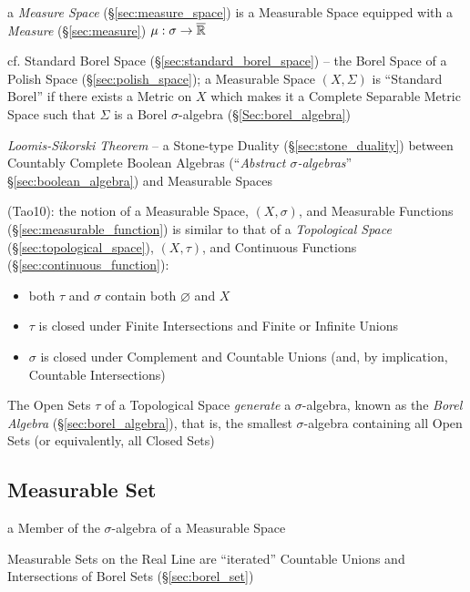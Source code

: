 \fist a \emph{Measure Space} (\S\ref{sec:measure_space}) is a Measurable Space
equipped with a \emph{Measure} (\S\ref{sec:measure})
$\mu : \sigma \rightarrow \overline{\mathbb{R}}$

\fist cf. Standard Borel Space (\S\ref{sec:standard_borel_space}) -- the Borel
Space of a Polish Space (\S\ref{sec:polish_space}); a Measurable Space $(X,
\Sigma)$ is ``Standard Borel'' if there exists a Metric on $X$ which makes it a
Complete Separable Metric Space such that $\Sigma$ is a Borel $\sigma$-algebra
(\S\ref{Sec:borel_algebra})

\emph{Loomis-Sikorski Theorem} -- a Stone-type Duality
(\S\ref{sec:stone_duality}) between Countably Complete Boolean Algebras
(``\emph{Abstract $\sigma$-algebras}'' \S\ref{sec:boolean_algebra}) and
Measurable Spaces

(Tao10): the notion of a Measurable Space, $(X,\sigma)$, and Measurable
Functions (\S\ref{sec:measurable_function}) is similar to that of a
\emph{Topological Space} (\S\ref{sec:topological_space}), $(X,\tau)$, and
Continuous Functions (\S\ref{sec:continuous_function}):
\begin{itemize}
  \item both $\tau$ and $\sigma$ contain both $\varnothing$ and $X$
  \item $\tau$ is closed under Finite Intersections and Finite or Infinite
    Unions
  \item $\sigma$ is closed under Complement and Countable Unions (and,
    by implication, Countable Intersections)
\end{itemize}
The Open Sets $\tau$ of a Topological Space \emph{generate} a $\sigma$-algebra,
known as the \emph{Borel Algebra} (\S\ref{sec:borel_algebra}), that is, the
smallest $\sigma$-algebra containing all Open Sets (or equivalently, all Closed
Sets)



\subsection{Measurable Set}\label{sec:measurable_set}

a Member of the $\sigma$-algebra of a Measurable Space

Measurable Sets on the Real Line are ``iterated'' Countable Unions and
Intersections of Borel Sets (\S\ref{sec:borel_set})

